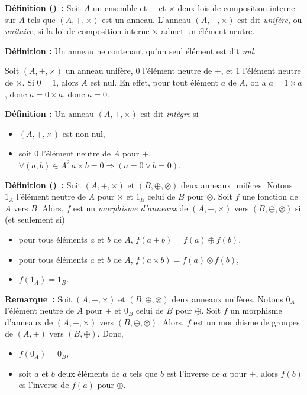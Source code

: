 \medskip

\noindent\textbf{Définition () :} Soit $A$ un ensemble et $+$ et $\times$ deux lois de composition interne sur $A$ tels que $(A, +, \times)$ est un anneau. 
    L'anneau $(A, +, \times)$ est dit \textit{unifère}, ou \textit{unitaire}, si la loi de composition interne $\times$ admet un élément neutre.

\medskip

\noindent\textbf{Définition :} Un anneau ne contenant qu'un seul élément est dit \textit{nul}. 

\medskip

Soit $(A, +, \times)$ un anneau unifère, $0$ l'élément neutre de $+$, et $1$ l'élément neutre de $\times$. 
Si $0 = 1$, alors $A$ est nul. 
En effet, pour tout élément $a$ de $A$, on a $a = 1 \times a$, donc $a = 0 \times a$, donc $a = 0$. 

\medskip

\noindent\textbf{Définition :} Un anneau $(A, +, \times)$ est dit \emph{intègre} si 
    \begin{itemize}[nosep]
        \item $(A, +, \times)$ est non nul, 
        \item soit $0$ l'élément neutre de $A$ pour $+$, $\forall (a, b) \in A^2 \, a \times b = 0 \Rightarrow (a = 0 \vee b = 0)$.
    \end{itemize}

\medskip

\noindent\textbf{Définition () :} Soit $(A, +, \times)$ et $(B, \oplus, \otimes)$ deux anneaux unifères.
    Notons $1_A$ l'élément neutre de $A$ pour $\times$ et $1_B$ celui de $B$ pour $\otimes$.
    Soit $f$ une fonction de $A$ vers $B$. 
    Alors, $f$ est un \emph{morphisme d'anneaux} de $(A, +, \times)$ vers $(B, \oplus, \otimes)$ si (et seulement si)
    \begin{itemize}[nosep]
        \item pour tous éléments $a$ et $b$ de $A$, $f(a + b) = f(a) \oplus f(b)$,
        \item pour tous éléments $a$ et $b$ de $A$, $f(a \times b) = f(a) \otimes f(b)$,
        \item $f(1_A) = 1_B$.
    \end{itemize}

\medskip

\noindent\textbf{Remarque :} Soit $(A, +, \times)$ et $(B, \oplus, \otimes)$ deux anneaux unifères.
    Notons $0_A$ l'élément neutre de $A$ pour $+$ et $0_B$ celui de $B$ pour $\oplus$.
    Soit $f$ un morphisme d'anneaux de $(A, +, \times)$ vers $(B, \oplus, \otimes)$.
    Alors, $f$ est un morphisme de groupes de $(A, +)$ vers $(B, \oplus)$.
    Donc, 
    \begin{itemize}[nosep]
        \item $f(0_A) = 0_B$, 
        \item soit $a$ et $b$ deux éléments de $a$ tels que $b$ est l'inverse de $a$ pour $+$, alors $f(b)$ es l'inverse de $f(a)$ pour $\oplus$.
    \end{itemize}

